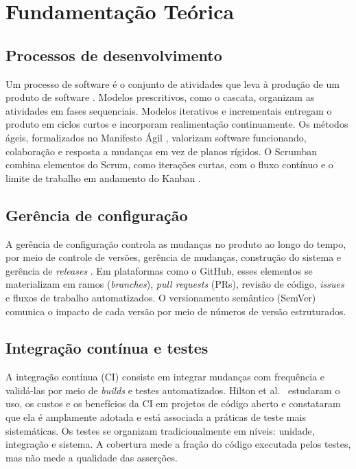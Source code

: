 \section{Fundamentação Teórica}
\label{sec:fund}

\subsection{Processos de desenvolvimento}

Um processo de software é o conjunto de atividades que leva à produção de um produto de software \cite{sommerville2011}. Modelos prescritivos, como o cascata, organizam as atividades em fases sequenciais. Modelos iterativos e incrementais entregam o produto em ciclos curtos e incorporam realimentação continuamente. Os métodos ágeis, formalizados no Manifesto Ágil \cite{beck2001}, valorizam software funcionando, colaboração e resposta a mudanças em vez de planos rígidos. O Scrumban combina elementos do Scrum, como iterações curtas, com o fluxo contínuo e o limite de trabalho em andamento do Kanban \cite{ladas2009}.

\subsection{Gerência de configuração}

A gerência de configuração controla as mudanças no produto ao longo do tempo, por meio de controle de versões, gerência de mudanças, construção do sistema e gerência de \textit{releases} \cite{sommerville2011}. Em plataformas como o GitHub, esses elementos se materializam em ramos (\textit{branches}), \textit{pull requests} (PRs), revisão de código, \textit{issues} e fluxos de trabalho automatizados. O versionamento semântico (SemVer) comunica o impacto de cada versão por meio de números de versão estruturados.

\subsection{Integração contínua e testes}

A integração contínua (CI) consiste em integrar mudanças com frequência e validá-las por meio de \textit{builds} e testes automatizados. Hilton et al.~\cite{hilton2016} estudaram o uso, os custos e os benefícios da CI em projetos de código aberto e constataram que ela é amplamente adotada e está associada a práticas de teste mais sistemáticas. Os testes se organizam tradicionalmente em níveis: unidade, integração e sistema. A cobertura mede a fração do código executada pelos testes, mas não mede a qualidade das asserções.

